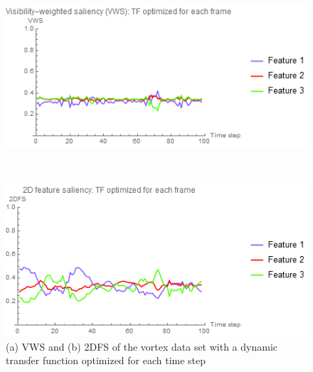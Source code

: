 \begin{figure}
	\centering
	\begin{minipage}{.5\textwidth}
		\includegraphics[width=1\linewidth]{images/vorts_optimized_parallelsearch_VWS}
		\subcaption{}
	\end{minipage}~
	\begin{minipage}{.5\textwidth}
		\includegraphics[width=1\linewidth]{images/vorts_optimized_parallelsearch_2DFS}
		\subcaption{}
	\end{minipage}
	\caption{(a) VWS and (b) 2DFS of the vortex data set with a dynamic transfer function optimized for each time step}
	\label{fig:vorts_dynamic}
\end{figure}

